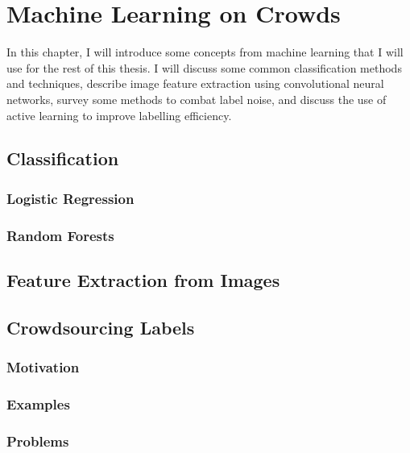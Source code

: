 \chapter{Machine Learning on Crowds}
\label{cha:ml}

 In this chapter, I will introduce some
concepts from machine learning that I will use for the rest of this thesis. I
will discuss some common classification methods and techniques, describe image
feature extraction using convolutional neural networks, survey some methods to
combat label noise, and discuss the use of active learning to improve labelling
efficiency.

\section{Classification}
\label{sec:classification}

    \subsection{Logistic Regression}
    \label{sec:logistic-regression}

    \subsection{Random Forests}
    \label{sec:random-forests}

\section{Feature Extraction from Images}
\label{sec:image-features}

\section{Crowdsourcing Labels}
\label{sec:crowdsourcing}

    \subsection{Motivation}
    \label{sec:crowdsourcing-motivation}

    \subsection{Examples}
    \label{sec:crowdsourcing-examples}

    \subsection{Problems}
    \label{sec:crowdsourcing-problems}

